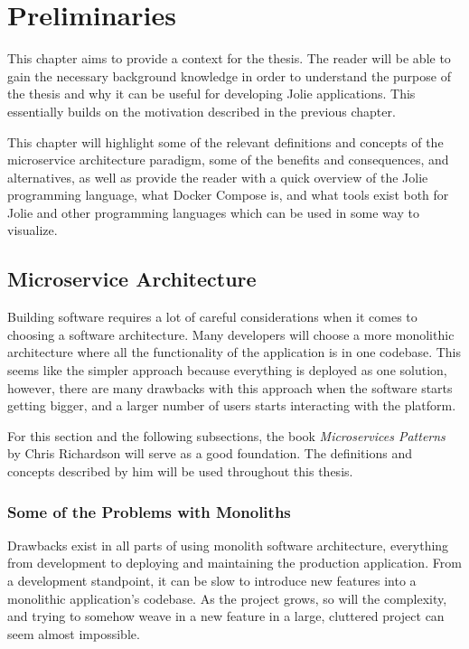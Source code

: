 \chapter{Preliminaries}
This chapter aims to provide a context for the thesis.
The reader will be able to gain the necessary background knowledge in order
to understand the purpose of the thesis and why it can be useful for developing Jolie applications. This 
essentially builds on the motivation
described in the previous chapter.

This chapter will highlight some of the relevant definitions and concepts of the microservice architecture paradigm, some of the benefits and consequences, and alternatives, as
 well as provide
the reader with a quick overview of the Jolie programming language,
what Docker Compose is, and what tools exist both for Jolie and
other programming languages which can be used in some way to visualize.

\section{Microservice Architecture}
Building software requires a lot of careful considerations when it comes
to choosing a software architecture. Many developers will choose a more monolithic architecture where all
 the functionality of the application
is in one codebase. This seems like the simpler approach because everything is deployed as one solution, however,
 there are many drawbacks
with this approach when the software starts getting bigger, and a larger number of users starts
interacting with the platform.

For this section and the following subsections, the book \textit{Microservices Patterns} by Chris Richardson \cite*{microservicepatterns} will serve as a good foundation. 
The definitions and concepts described by him will be used throughout this thesis.

\subsection{Some of the Problems with Monoliths}
Drawbacks exist in all parts of using monolith software architecture, everything from development to
deploying and maintaining the production application.
From a development standpoint, it can be slow to introduce new features into a monolithic application's
 codebase. As the project grows, so will the complexity, and trying to somehow weave in a new feature in a large, cluttered project can seem almost impossible.

